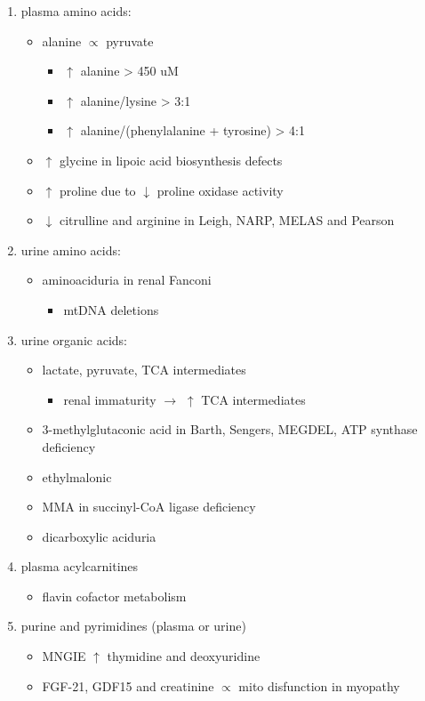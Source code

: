 \documentclass[12pt]{scrartcl}
\begin{document}
\begin{enumerate}
\item plasma amino acids:
\label{sec:org1b34fbc}
\begin{itemize}
\item alanine \(\propto\) pyruvate
\begin{itemize}
\item \(\uparrow\) alanine \textgreater{} 450 uM
\item \(\uparrow\) alanine/lysine \textgreater{} 3:1
\item \(\uparrow\) alanine/(phenylalanine + tyrosine) \textgreater{} 4:1
\end{itemize}
\item \(\uparrow\) glycine in lipoic acid biosynthesis defects
\item \(\uparrow\) proline due to \(\downarrow\) proline oxidase activity
\item \(\downarrow\) citrulline and arginine in Leigh, NARP, MELAS and Pearson
\end{itemize}
\item urine amino acids:
\label{sec:org27a9f52}
\begin{itemize}
\item aminoaciduria in renal Fanconi
\begin{itemize}
\item mtDNA deletions
\end{itemize}
\end{itemize}
\item urine organic acids:
\label{sec:org54c9918}
\begin{itemize}
\item lactate, pyruvate, TCA intermediates
\begin{itemize}
\item renal immaturity \(\to\) \(\uparrow\) TCA intermediates
\end{itemize}
\item 3-methylglutaconic acid in Barth, Sengers, MEGDEL, ATP synthase deficiency
\item ethylmalonic
\item MMA in succinyl-CoA ligase deficiency
\item dicarboxylic aciduria
\end{itemize}
\item plasma acylcarnitines
\label{sec:org0813277}
\begin{itemize}
\item flavin cofactor metabolism
\end{itemize}
\item purine and pyrimidines (plasma or urine)
\label{sec:org1606ef0}
\begin{itemize}
\item MNGIE \(\uparrow\) thymidine and deoxyuridine
\end{itemize}
\begin{itemize}
\item FGF-21, GDF15 and creatinine \(\propto\) mito disfunction in myopathy
\end{itemize}


\end{enumerate}
\end{document}
